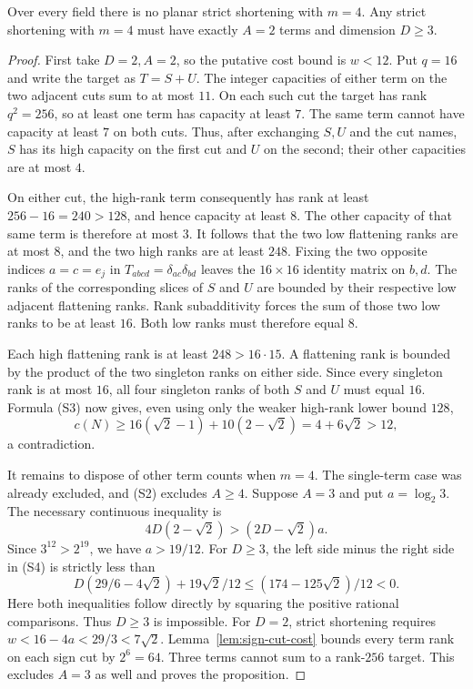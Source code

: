 \begin{proposition}
\label{prop:width-four-shortening}
Over every field there is no planar strict shortening with
$m=4$.  Any strict shortening with $m=4$ must have exactly
$A=2$ terms and dimension $D\ge3$.
\end{proposition}
\begin{proof}
First take $D=2,A=2$, so the putative cost bound is $w<12$.
Put $q=16$ and write the target as $T=S+U$.
The integer capacities of either term on the two adjacent
cuts sum to at most $11$.  On each such cut the target has
rank $q^2=256$, so at least one term has capacity at least
$7$.  The same term cannot have capacity at least $7$ on
both cuts.  Thus, after exchanging $S,U$ and the cut names,
$S$ has its high capacity on the first cut and $U$ on the
second; their other capacities are at most $4$.

On either cut, the high-rank term consequently has rank
at least $256-16=240>128$, and hence capacity at least $8$.
The other capacity of that same term is therefore at most
$3$.  It follows that the two low flattening ranks are at
most $8$, and the two high ranks are at least $248$.
Fixing the two opposite indices $a=c=e_j$ in
$T_{abcd}=\delta_{ac}\delta_{bd}$ leaves the $16\times16$
identity matrix on $b,d$.  The ranks of the corresponding
slices of $S$ and $U$ are bounded by their respective low
adjacent flattening ranks.  Rank subadditivity forces the
sum of those two low ranks to be at least $16$.
Both low ranks must therefore equal $8$.

Each high flattening rank is at least $248>16\cdot15$.
A flattening rank is bounded by the product of the two
singleton ranks on either side.  Since every singleton
rank is at most $16$, all four singleton ranks of both
$S$ and $U$ must equal $16$.  Formula (S3) now gives,
even using only the weaker high-rank lower bound $128$,
\[
 c(N)\ge16(\sqrt2-1)+10(2-\sqrt2)
       =4+6\sqrt2>12,
\]
a contradiction.

It remains to dispose of other term counts when $m=4$.
The single-term case was already excluded, and (S2)
excludes $A\ge4$.  Suppose $A=3$ and put $a=\log_2 3$.
The necessary continuous inequality is
\[
 4D(2-\sqrt2)>(2D-\sqrt2)a.                         \tag{S4}
\]
Since $3^{12}>2^{19}$, we have $a>19/12$.
For $D\ge3$, the left side minus the right side in (S4)
is strictly less than
\[
 D(29/6-4\sqrt2)+19\sqrt2/12
 \le(174-125\sqrt2)/12<0.
\]
Here both inequalities follow directly by squaring the
positive rational comparisons.  Thus $D\ge3$ is impossible.
For $D=2$, strict shortening requires
$w<16-4a<29/3<7\sqrt2$.  Lemma~\ref{lem:sign-cut-cost}
bounds every term rank on each sign cut by $2^6=64$.
Three terms cannot sum to a rank-$256$ target.  This
excludes $A=3$ as well and proves the proposition.
\end{proof}

